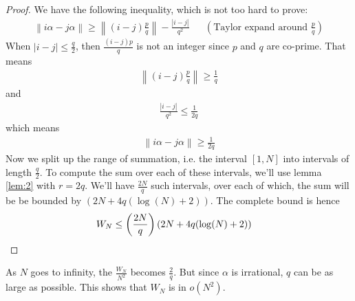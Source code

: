\documentclass[12pt]{article}
\theoremstyle{definition}
\newcommand{\norm}[1]{\left\lVert#1\right\rVert}
\begin{document}
\begin{proof}
    We have the following inequality, which is not too hard to prove:
    \begin{align*}
        \norm{i\alpha - j\alpha} \geq \norm{(i-j)\frac{p}{q}} - \frac{|i-j|}{q^2} &&\left(\text{Taylor expand around $\frac{p}{q}$}\right)
    \end{align*}
    When $|i-j| \leq \frac{q}{2}$, then $\frac{(i-j)p}{q}$ is not an integer since $p$ and $q$ are co-prime. That means
    \begin{align*}
        \norm{(i-j)\frac{p}{q}} \geq \frac{1}{q}
    \end{align*}
    and 
    \begin{align*}
        \frac{|i-j|}{q^2} \leq \frac{1}{2q}
    \end{align*}
    which means
    \begin{align*}
        \norm{i\alpha - j\alpha} \geq \frac{1}{2q}
    \end{align*}
    Now we split up the range of summation, i.e. the interval $[1, N]$ into intervals of length $\frac{q}{2}$. To compute the sum over each of these intervals, we'll use lemma \ref{lem:2} with $r = 2q$. We'll have $\frac{2N}{q}$ such intervals, over each of which, the sum will be be bounded by $\left( 2N +4q(\log(N) +2) \right)$. The complete bound is hence
    \begin{align*}
        W_N \leq \left( \frac{2N}{q}\right) \left( 2N +4q(\log(N) +2) \right) &\qedhere
    \end{align*}
\end{proof}
As $N$ goes to infinity, the $\frac{W_N}{N^2}$ becomes $\frac{2}{q}$. But since $\alpha$ is irrational, $q$ can be as large as possible. This shows that $W_N$ is in $o(N^2)$.



\end{document}
